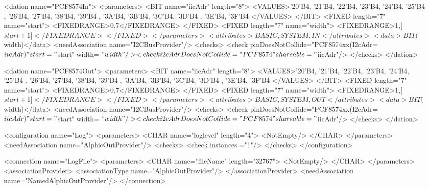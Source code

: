 \begin{XMLCode}
      <dation name="PCF8574In">
         <parameters>
            <BIT name="iicAdr" length="8">
               <VALUES>'20'B4, '21'B4, '22'B4, '23'B4,
                       '24'B4, '25'B4 , '26'B4, '27'B4,
                       '38'B4, '39'B4 , '3A'B4, '3B'B4,
                       '3C'B4, '3D'B4 , '3E'B4, '3F'B4
               </VALUES>
            </BIT>
            <FIXED length="7" name="start">
               <FIXEDRANGE>0,7</FIXEDRANGE>
            </FIXED>
            <FIXED length="7" name="width">
               <FIXEDRANGE>1,[$start+1]</FIXEDRANGE>
            </FIXED>
         </parameters>
	 <attributes>
            BASIC, SYSTEM, IN
         </attributes>
         <data>BIT($width)</data>
         <needAssociation name="I2CBusProvider"/>
         <checks>
           <check pinDoesNotCollide="PCF8574xx(I2cAdr=$iicAdr)" 
		start="$start" width= "$width" />
           <check i2cAdrDoesNotCollide="PCF8574"
                   shareable="$iicAdr"/>
         </checks>
      </dation>

      <dation name="PCF8574Out">
         <parameters>
            <BIT name="iicAdr" length="8">
               <VALUES>'20'B4, '21'B4, '22'B4, '23'B4,
                       '24'B4, '25'B4 , '26'B4, '27'B4,
                       '38'B4, '39'B4 , '3A'B4, '3B'B4,
                       '3C'B4, '3D'B4 , '3E'B4, '3F'B4
               </VALUES>
            </BIT>
            <FIXED length="7" name="start">
               <FIXEDRANGE>0,7</FIXEDRANGE>
            </FIXED>
            <FIXED length="7" name="width">
               <FIXEDRANGE>1,[$start+1]</FIXEDRANGE>
            </FIXED>
         </parameters>
	 <attributes>
            BASIC, SYSTEM, OUT
         </attributes>
         <data>BIT($width)</data>
         <needAssociation name="I2CBusProvider"/>
         <checks>
           <check pinDoesNotCollide="PCF8574xx(I2cAdr=$iicAdr)" 
		start="$start" width= "$width"/>
           <check i2cAdrDoesNotCollide="PCF8574"
                   shareable="$iicAdr"/>
         </checks>
      </dation>

  <configuration name="Log">
    <parameters>
      <CHAR name="loglevel" length="4">
         <NotEmpty/>
      </CHAR>
    </parameters>
    <needAssociation name="AlphicOutProvider"/>
    <checks>
       <check instances ="1"/>
    </checks>
  </configuration>

   <connection name="LogFile">
      <parameters>
         <CHAR name="fileName" length="32767">
            <NotEmpty/>
         </CHAR>
      </parameters>
      <associationProvider>
         <associationType name="AlphicOutProvider"/>
      </associationProvider>
      <needAssociation name="NamedAlphicOutProvider"/>
   </connection>


\end{XMLCode}
